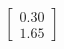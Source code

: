 \documentclass[preview]{standalone}
\begin{document}
\begin{align*}
\begin{bmatrix} 0.30 \\ 1.65 \end{bmatrix}
\end{align*}
\end{document}
